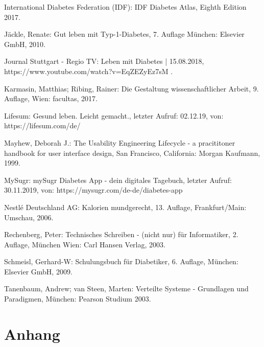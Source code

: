 \documentclass[a4paper,11pt]{article}%
\renewcommand{\\}{\vspace*{0.5\baselineskip} \newline}
\begin{document}
\begin{thebibliography}{1}
		International Diabetes Federation (IDF): 
		IDF Diabetes Atlas, Eighth Edition 2017.
		
		Jäckle, Renate: 
		Gut leben mit Typ-1-Diabetes, 7. Auflage
		München: Elsevier GmbH,
		2010.
		
		Journal Stuttgart - Regio TV: 
		Leben mit Diabetes | 15.08.2018, \newline
		https://www.youtube.com/watch?v=EqZEZyEz7sM .
		
		Karmasin, Matthias; Ribing, Rainer: 
		Die Gestaltung wissenschaftlicher Arbeit, 9. Auflage,
		Wien: facultas,
		2017.
		
		Lifesum: Gesund leben. Leicht gemacht., letzter Aufruf: 02.12.19, von: \newline https://lifesum.com/de/
		
		
		Mayhew, Deborah J.: 
		The Usability Engineering Lifecycle - a pracititoner handbook for user interface design,
		San Francisco, California: Morgan Kaufmann,
		1999.
		
		MySugr:
		mySugr Diabetes App - dein digitales Tagebuch, letzter Aufruf: 30.11.2019, von:	
		https://mysugr.com/de-de/diabetes-app
		
		Nestlé Deutschland AG: 
		Kalorien mundgerecht, 13. Auflage, Frankfurt/Main: Umschau,
		2006.
		
		Rechenberg, Peter: 
		Technisches Schreiben - (nicht nur) für Informatiker, 2. Auflage,
		München Wien: Carl Hansen Verlag,
		2003.
		
		Schmeisl, Gerhard-W: 
		Schulungsbuch für Diabetiker, 6. Auflage, 
		München: Elsevier GmbH,
		2009.
		
		Tanenbaum, Andrew; van Steen, Marten: 
		Verteilte Systeme - Grundlagen und Paradigmen,
		München: Pearson Studium
		2003.
		
	\end{thebibliography}
	\newpage
	\appendix
	\vspace*{\fill}
	\part*{Anhang}
	\setcounter{section}{0}%
	\setcounter{subsection}{0}%
	\setcounter{figure}{0}
	\renewcommand{\thesection}{\Alph{section}}
	\renewcommand\thefigure{\Alph{section}\arabic{figure}}
	\vfill
	\newpage
	
\end{document}
